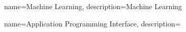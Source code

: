 \RequirePackage{glossaries}
\makeglossaries


{
    name=Machine Learning,
    description={Machine Learning}
}

{
    name=Application Programming Interface,
    description={}
}


